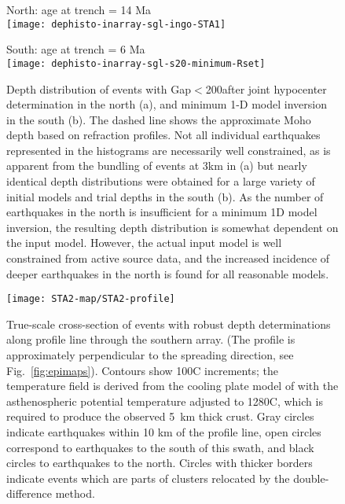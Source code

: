\documentclass[reviewcopy]{elsarticle}
\renewcommand{\includegraphics}[2][]{\fbox{#2}}
\begin{document}
\begin{figure}

\begin{minipage}[t]{0.49\textwidth}
{ North: age at trench = 14 Ma} \\
\texttt{[image: dephisto-inarray-sgl-ingo-STA1]}
\end{minipage}\hfill%
\begin{minipage}[t]{0.49\textwidth}
{ South: age at trench = 6 Ma} \\
\texttt{[image: dephisto-inarray-sgl-s20-minimum-Rset]}
\end{minipage}


\caption{Depth distribution of events with
  Gap$<$200\dg after  joint
  hypocenter determination in the north (a), and minimum 1-D model
inversion in the south (b). The
  dashed line shows the approximate Moho depth based on refraction
profiles.
Not all individual earthquakes represented in the
  histograms are necessarily well constrained, as is apparent from the
  bundling of events at 3km in (a) but nearly identical depth distributions were
  obtained for a large variety of initial models and trial depths in
  the south
  (b).  As the number of earthquakes in the north is insufficient for
  a minimum 1D model inversion, the resulting depth distribution is
  somewhat dependent on the input model.  However, the actual input model
  is well constrained from active source data, and the increased
  incidence of deeper earthquakes in the north is found for all
  reasonable models.
}
\label{fig:dephistos}
\end{figure}


\begin{figure}
\centering
\texttt{[image: STA2-map/STA2-profile]}
\caption{True-scale cross-section of events with robust depth determinations along
  profile line through the southern array. (The profile is
  approximately perpendicular to the spreading direction, see Fig.~\ref{fig:epimaps}). Contours show 100\dg C increments; the temperature field is derived
  from the cooling plate model of \citet{mckenzie05} with the
  asthenospheric potential temperature adjusted to 1280\dg C, which is
  required to produce the observed 5~km thick crust. Gray circles
  indicate earthquakes within 10 km of the profile line, open circles
  correspond to earthquakes to the south of this swath, and black circles to
  earthquakes to the north. Circles with thicker borders indicate
  events which are parts of clusters relocated by the
  double-difference method.
}
\label{fig:profiles}
\end{figure}
\end{document}
